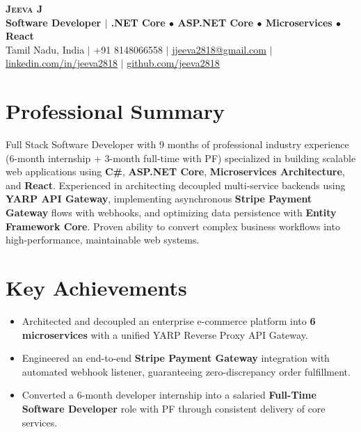 \documentclass[letterpaper,11pt]{article}
\newcommand{\resumeItem}[1]{
  \item\small{
    {#1 \vspace{-2pt}}
  }
}
\begin{document}
\begin{center}
    \textbf{\Huge \scshape Jeeva J} \\ \vspace{2pt}
    \textbf{Software Developer $|$ .NET Core $\bullet$ ASP.NET Core $\bullet$ Microservices $\bullet$ React} \\ \vspace{2pt}
    \small Tamil Nadu, India $|$ +91 8148066558 $|$ \href{mailto:jjeeva2818@gmail.com}{\underline{jjeeva2818@gmail.com}} $|$ 
    \href{https://linkedin.com/in/jeeva2818}{\underline{linkedin.com/in/jeeva2818}} $|$
    \href{https://github.com/jeeva2818}{\underline{github.com/jeeva2818}}
\end{center}


\section{Professional Summary}
\small{Full Stack Software Developer with 9 months of professional industry experience (6-month internship + 3-month full-time with PF) specialized in building scalable web applications using \textbf{C\#}, \textbf{ASP.NET Core}, \textbf{Microservices Architecture}, and \textbf{React}. Experienced in architecting decoupled multi-service backends using \textbf{YARP API Gateway}, implementing asynchronous \textbf{Stripe Payment Gateway} flows with webhooks, and optimizing data persistence with \textbf{Entity Framework Core}. Proven ability to convert complex business workflows into high-performance, maintainable web systems.}


\section{Key Achievements}
\begin{itemize}[leftmargin=0.15in, label={$\bullet$}]
    \resumeItem{Architected and decoupled an enterprise e-commerce platform into \textbf{6 microservices} with a unified YARP Reverse Proxy API Gateway.}
    \resumeItem{Engineered an end-to-end \textbf{Stripe Payment Gateway} integration with automated webhook listener, guaranteeing zero-discrepancy order fulfillment.}
    \resumeItem{Converted a 6-month developer internship into a salaried \textbf{Full-Time Software Developer} role with PF through consistent delivery of core services.}
\end{itemize}
\end{document}
